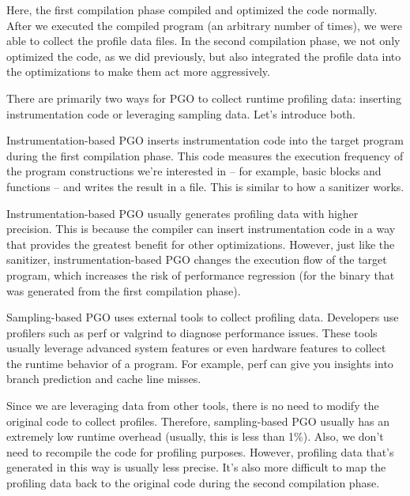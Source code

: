 Here, the first compilation phase compiled and optimized the code normally. After we executed the compiled program (an arbitrary number of times), we were able to collect the profile data files. In the second compilation phase, we not only optimized the code, as we did previously, but also integrated the profile data into the optimizations to make them act more aggressively. 

There are primarily two ways for PGO to collect runtime profiling data: inserting instrumentation code or leveraging sampling data. Let's introduce both.



Instrumentation-based PGO inserts instrumentation code into the target program during the first compilation phase. This code measures the execution frequency of the program constructions we're interested in – for example, basic blocks and functions – and writes the result in a file. This is similar to how a sanitizer works.

Instrumentation-based PGO usually generates profiling data with higher precision. This is because the compiler can insert instrumentation code in a way that provides the greatest benefit for other optimizations. However, just like the sanitizer, instrumentation-based PGO changes the execution flow of the target program, which increases the risk of performance regression (for the binary that was generated from the first compilation phase).


Sampling-based PGO uses external tools to collect profiling data. Developers use profilers such as perf or valgrind to diagnose performance issues. These tools usually leverage advanced system features or even hardware features to collect the runtime behavior of a program. For example, perf can give you insights into branch prediction and cache line misses.

Since we are leveraging data from other tools, there is no need to modify the original code to collect profiles. Therefore, sampling-based PGO usually has an extremely low runtime overhead (usually, this is less than 1\%). Also, we don't need to recompile the code for profiling purposes. However, profiling data that's generated in this way is usually less precise. It's also more difficult to map the profiling data back to the original code during the second compilation phase.

